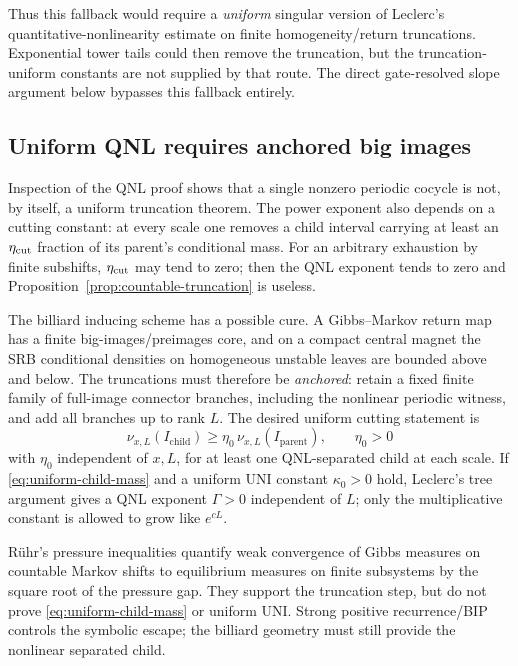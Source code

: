 \documentclass[11pt]{article}
\begin{document}
Thus this fallback would require a \emph{uniform} singular version of
Leclerc's quantitative-nonlinearity estimate on finite homogeneity/return
truncations.  Exponential tower tails could then remove the truncation, but
the truncation-uniform constants are not supplied by that route.  The
direct gate-resolved slope argument below bypasses this fallback entirely.

\subsection{Uniform QNL requires anchored big images}

Inspection of the QNL proof shows that a single nonzero periodic cocycle is
not, by itself, a uniform truncation theorem.  The power exponent also depends
on a cutting constant: at every scale one removes a child interval carrying
at least an $\eta_{\rm cut}$ fraction of its parent's conditional mass.  For
an arbitrary exhaustion by finite subshifts, $\eta_{\rm cut}$ may tend to
zero; then the QNL exponent tends to zero and
Proposition~\ref{prop:countable-truncation} is useless.

The billiard inducing scheme has a possible cure.  A Gibbs--Markov return map
has a finite big-images/preimages core, and on a compact central magnet the
SRB conditional densities on homogeneous unstable leaves are bounded above
and below.  The truncations must therefore be \emph{anchored}: retain a fixed
finite family of full-image connector branches, including the nonlinear
periodic witness, and add all branches up to rank $L$.  The desired uniform
cutting statement is
\begin{equation}
\label{eq:uniform-child-mass}
 \nu_{x,L}(I_{\mathrm{child}})
 \ge\eta_0\,\nu_{x,L}(I_{\mathrm{parent}}),
 \qquad \eta_0>0
\end{equation}
with $\eta_0$ independent of $x,L$, for at least one QNL-separated child at
each scale.  If \eqref{eq:uniform-child-mass} and a uniform UNI constant
$\kappa_0>0$ hold, Leclerc's tree argument gives a QNL exponent
$\Gamma>0$ independent of $L$; only the multiplicative constant is allowed
to grow like $e^{cL}$.

R\"uhr's pressure inequalities quantify weak convergence of Gibbs measures
on countable Markov shifts to equilibrium measures on finite subsystems by
the square root of the pressure gap.  They support the truncation step, but
do not prove \eqref{eq:uniform-child-mass} or uniform UNI.  Strong positive
recurrence/BIP controls the symbolic escape; the billiard geometry must still
provide the nonlinear separated child.
\end{document}
